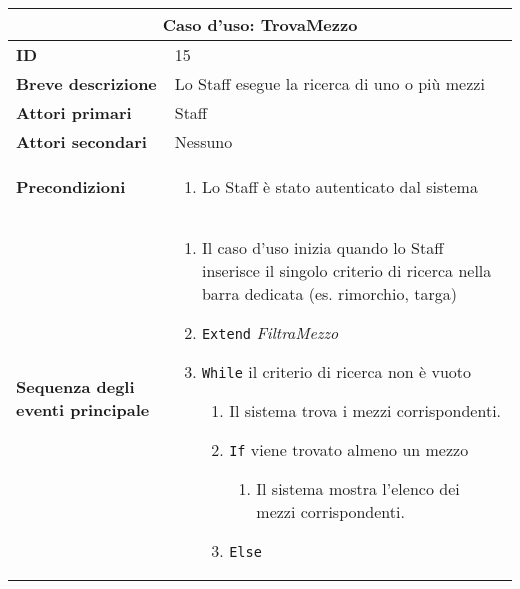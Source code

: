 \documentclass[a4paper]{report}
\begin{document}
\clearpage
\begin{table}[H]
\vspace*{-0cm}
\renewcommand{\arraystretch}{1.9}
\begin{tabular}{|p{3.9cm}|p{9.9cm}|}
\hline
\multicolumn{2}{|c|}{\textbf{Caso d’uso: TrovaMezzo}} \\ \hline
        \textbf{ID} & 15 \\ \hline
        \textbf{Breve descrizione} & Lo Staff esegue la ricerca di uno o più mezzi \\ \hline
	\textbf{Attori primari} & Staff \\ \hline
	\textbf{Attori secondari} & Nessuno \\ \hline
	\textbf{Precondizioni} & \begin{enumerate}[label=\arabic*.,leftmargin=14pt,labelsep=0.5em,topsep=0pt,partopsep=0pt,parsep=0pt,itemsep=0pt]
        \item Lo Staff è stato autenticato dal sistema
    \end{enumerate} \\ \hline
	\textbf{Sequenza degli eventi principale} & 
\begin{enumerate}[leftmargin=14pt,label=\arabic*.,labelsep=0.5em,topsep=0pt,partopsep=0pt,parsep=0pt,itemsep=0pt]
    \item Il caso d’uso inizia quando lo Staff inserisce il singolo criterio di ricerca nella barra dedicata (es. rimorchio, targa)
    \item \texttt{Extend} \textit{FiltraMezzo}
    \item \texttt{While} il criterio di ricerca non è vuoto
    \begin{enumerate}[label=\arabic{enumi}.\arabic*.,leftmargin=22pt,labelsep=0.5em,topsep=0pt,partopsep=0pt,parsep=0pt,itemsep=0pt]
        \item Il sistema trova i mezzi corrispondenti.
        \item \texttt{If} viene trovato almeno un mezzo
        \begin{enumerate}[label=\arabic{enumi}.\arabic{enumii}.\arabic*.,leftmargin=22pt,labelsep=0.5em,topsep=0pt,partopsep=0pt,parsep=0pt,itemsep=0pt]
            \item Il sistema mostra l’elenco dei mezzi corrispondenti.
        \end{enumerate}
        \item \texttt{Else}
        \begin{enumerate}[label=\arabic{enumi}.\arabic{enumii}.\arabic*.,leftmargin=22pt,labelsep=0.5em,topsep=0pt,partopsep=0pt,parsep=0pt,itemsep=0pt]

\end{enumerate}
\end{enumerate}
\end{enumerate}
\end{tabular}
\end{table}
\end{document}
